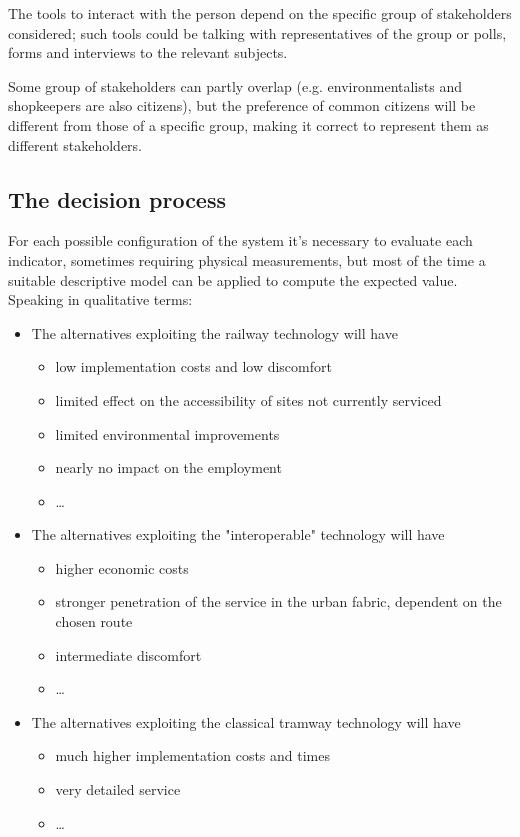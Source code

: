 The tools to interact with the person depend on the specific group of stakeholders considered; such tools could be talking with representatives of the group or polls, forms and interviews to the relevant subjects.

Some group of stakeholders can partly overlap (e.g. environmentalists and shopkeepers are also citizens), but the preference of common citizens will be different from those of a specific group, making it correct to represent them as different stakeholders.

\subsection{The decision process}
\label{subsec:comodecisionprocess}

For each possible configuration of the system it's necessary to evaluate each indicator, sometimes requiring physical measurements, but most of the time a suitable descriptive model can be applied to compute the expected value. Speaking in qualitative terms:
\begin{itemize}
	\item The alternatives exploiting the railway technology will have
	\begin{itemize}
		\item low implementation costs and low discomfort
		
		\item limited effect on the accessibility of sites not currently serviced
		
		\item limited environmental improvements
		
		\item nearly no impact on the employment
		
		\item \dots
	\end{itemize}
	
	\item The alternatives exploiting the "interoperable" technology will have
	\begin{itemize}
		\item higher economic costs
		
		\item stronger penetration of the service in the urban fabric, dependent on the chosen route
		
		\item intermediate discomfort
		
		\item \dots
	\end{itemize}
	
	\item The alternatives exploiting the classical tramway technology will have
	\begin{itemize}
		\item much higher implementation costs and times
		
		\item very detailed service
		
		\item \dots
	\end{itemize}
\end{itemize}

